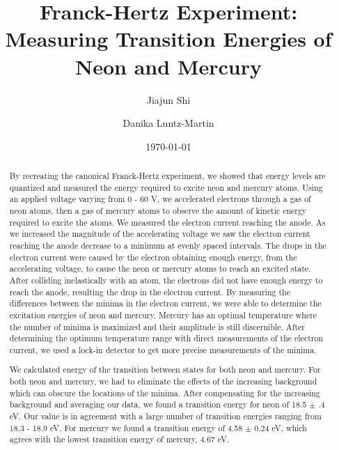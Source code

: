 \documentclass[prb,preprint]{revtex4-1}
\begin{document}
\title{Franck-Hertz Experiment: Measuring Transition Energies of Neon and Mercury}

\author{Jiajun Shi}


\author{Danika Luntz-Martin}


\date{\today}

\begin{abstract}

By recreating the canonical Franck-Hertz experiment, we showed that energy levels are quantized and measured the energy required to excite neon and mercury atoms. Using an applied voltage varying from 0 - 60 V, we accelerated electrons through a gas of neon atoms, then a gas of mercury atoms to observe the amount of kinetic energy required to excite the atoms. We measured the electron current reaching the anode. As we increased the magnitude of the accelerating voltage we saw the electron current reaching the anode decrease to a minimum at evenly spaced intervals. The drops in the electron current were caused by the electron obtaining enough energy, from the accelerating voltage, to cause the neon or mercury atoms to reach an excited state. After colliding inelastically with an atom, the electrons did not have enough energy to reach the anode, resulting the drop in the electron current. By measuring the differences between the minima in the electron current, we were able to determine the excitation energies of neon and mercury. Mercury has an optimal temperature where the number of minima is maximized and their amplitude is still discernible. After determining the optimum temperature range with direct measurements of the electron current, we used a lock-in detector to get more precise measurements of the minima.

We calculated energy of the transition between states for both neon and mercury. For both neon and mercury, we had to eliminate the effects of the increasing background which can obscure the locations of the minima. After compensating for the increasing background and averaging our data, we found a transition energy for neon of 18.5 $\pm$ .4 eV. Our value is in agreement with a large number of transition energies ranging from 18.3 - 18.9 eV. For mercury we found a transition energy of 4.58 $\pm$ 0.24 eV, which agrees with the lowest transition energy of mercury, 4.67 eV.

\end{abstract}
\end{document}

